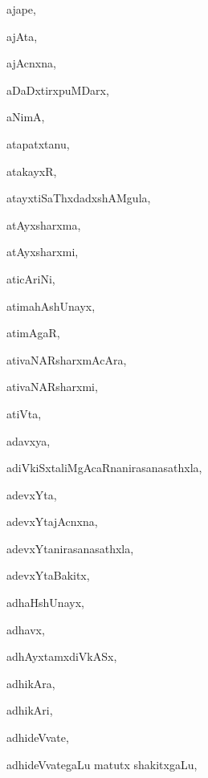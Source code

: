 \begin{multicols}{3}
{\noindent
{ajape}, \pageref{ajape}

\noindent
{ajAta}, \pageref{ajAta}

\noindent
{ajAcnxna}, \pageref{ajAcnxna}

\noindent
{aDaDxtirxpuMDarx}, \pageref{aDaDxtirxpuMDarx}

\noindent
{aNimA}, \pageref{aNimA}

\noindent
{atapatxtanu}, \pageref{atapatxtanu}

\noindent
{atakayxR}, \pageref{atakayxR}

\noindent
{atayxtiSaThxdadxshAMgula}, \pageref{atayxtiSaThxdadxshAMgula}

\noindent
{atAyxsharxma}, \pageref{atAyxsharxma}

\noindent
{atAyxsharxmi}, \pageref{atAyxsharxmi}

\noindent
{aticAriNi}, \pageref{aticAriNi}

\noindent
{atimahAshUnayx}, \pageref{atimahAshUnayx}

\noindent
{atimAgaR}, \pageref{atimAgaR}

\noindent
{ativaNARsharxmAcAra}, \pageref{ativaNARsharxmAcAra}

\noindent
{ativaNARsharxmi}, \pageref{ativaNARsharxmi}

\noindent
{atiVta}, \pageref{atiVta}

\noindent
{adavxya}, \pageref{adavxya}

\noindent
{adiVkiSxtaliMgAcaRnanirasanasathxla}, \pageref{adiVkiSxtaliMgAcaRnanirasanasathxla}

\noindent
{adevxYta}, \pageref{adevxYta}

\noindent
{adevxYtajAcnxna}, \pageref{adevxYtajAcnxna}

\noindent
{adevxYtanirasanasathxla}, \pageref{adevxYtanirasanasathxla}

\noindent
{adevxYtaBakitx}, \pageref{adevxYtaBakitx}

\noindent
{adhaHshUnayx}, \pageref{adhaHshUnayx}

\noindent
{adhavx}, \pageref{adhavx}

\noindent
{adhAyxtamxdiVkASx}, \pageref{adhAyxtamxdiVkASx}

\noindent
{adhikAra}, \pageref{adhikAra}

\noindent
{adhikAri}, \pageref{adhikAri}

\noindent
{adhideVvate}, \pageref{adhideVvate}

\noindent
{adhideVvategaLu matutx shakitxgaLu}, \pageref{adhideVvategaLu matutx shakitxgaLu}

}
\end{multicols}
